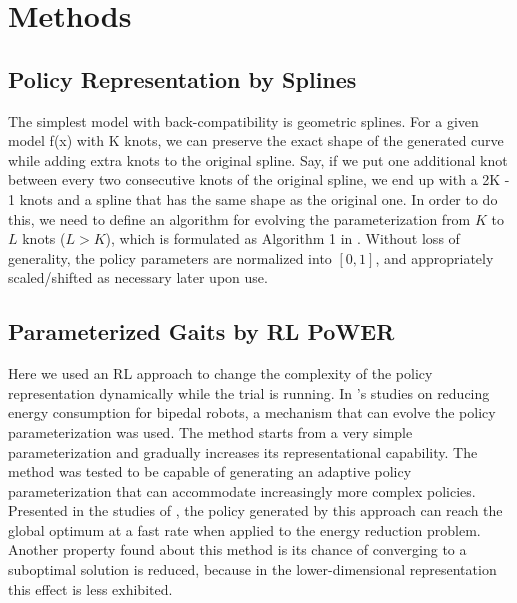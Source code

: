 \section{Methods}

\subsection{Policy Representation by Splines}
The simplest model with back-compatibility is geometric
splines. For a given model f(x) with K knots, we can preserve the
exact shape of the generated curve while adding extra knots to the
original spline. Say, if we put one additional knot between every two
consecutive knots of the original spline, we end up with a 2K - 1
knots and a spline that has the same shape as the original one. In
order to do this, we need to define an algorithm for evolving the
parameterization from $K$ to $L$ knots ($L > K$), which is formulated as 
Algorithm 1 in \cite{kormushev2011bipedal-walking-energy}.  Without loss of generality, the policy parameters are
normalized into $[0, 1]$, and appropriately scaled/shifted as necessary
later upon use.

\subsection{Parameterized Gaits by RL PoWER}

Here we used an RL approach to change the complexity of the policy
representation dynamically while the trial is running. In
\cite{kormushev2011bipedal-walking-energy}'s studies on reducing energy
consumption for bipedal robots, a mechanism that can
evolve the policy parameterization was used. The method starts from a
very simple parameterization and gradually increases its
representational capability. The method was tested to be capable of generating
an adaptive policy parameterization that can accommodate increasingly
more complex policies. Presented in the studies of \cite{kormushev2011bipedal-walking-energy}, the policy
generated by this approach can reach the global optimum at a fast
rate when applied to the energy reduction problem. Another property found about this method is its chance of converging to a suboptimal solution is reduced, because in the lower-dimensional representation this effect is less exhibited.


